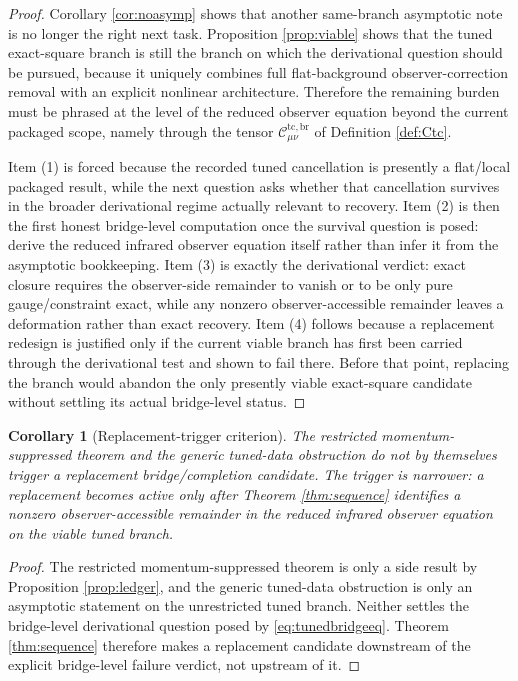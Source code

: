 \documentclass[11pt]{article}
\newtheorem{corollary}{Corollary}
\begin{document}
\begin{proof}
Corollary \ref{cor:noasymp} shows that another same-branch asymptotic note is no longer the right next task. Proposition \ref{prop:viable} shows that the tuned exact-square branch is still the branch on which the derivational question should be pursued, because it uniquely combines full flat-background observer-correction removal with an explicit nonlinear architecture. Therefore the remaining burden must be phrased at the level of the reduced observer equation beyond the current packaged scope, namely through the tensor \(\mathcal C_{\mu\nu}^{\mathrm{tc,br}}\) of Definition \ref{def:Ctc}.

Item (1) is forced because the recorded tuned cancellation is presently a flat/local packaged result, while the next question asks whether that cancellation survives in the broader derivational regime actually relevant to recovery. Item (2) is then the first honest bridge-level computation once the survival question is posed: derive the reduced infrared observer equation itself rather than infer it from the asymptotic bookkeeping. Item (3) is exactly the derivational verdict: exact closure requires the observer-side remainder to vanish or to be only pure gauge/constraint exact, while any nonzero observer-accessible remainder leaves a deformation rather than exact recovery. Item (4) follows because a replacement redesign is justified only if the current viable branch has first been carried through the derivational test and shown to fail there. Before that point, replacing the branch would abandon the only presently viable exact-square candidate without settling its actual bridge-level status.
\end{proof}

\begin{corollary}[Replacement-trigger criterion]
\label{cor:trigger}
The restricted momentum-suppressed theorem and the generic tuned-data obstruction do \emph{not} by themselves trigger a replacement bridge/completion candidate. The trigger is narrower: a replacement becomes active only after Theorem \ref{thm:sequence} identifies a nonzero observer-accessible remainder in the reduced infrared observer equation on the viable tuned branch.
\end{corollary}

\begin{proof}
The restricted momentum-suppressed theorem is only a side result by Proposition \ref{prop:ledger}, and the generic tuned-data obstruction is only an asymptotic statement on the unrestricted tuned branch. Neither settles the bridge-level derivational question posed by \eqref{eq:tunedbridgeeq}. Theorem \ref{thm:sequence} therefore makes a replacement candidate downstream of the explicit bridge-level failure verdict, not upstream of it.
\end{proof}
\end{document}
